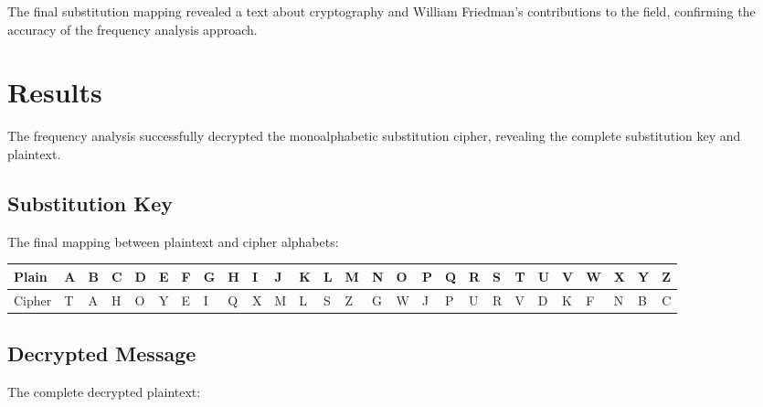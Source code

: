 \documentclass[a4paper,12pt]{article}
\begin{document}
The final substitution mapping revealed a text about cryptography and William Friedman's contributions to the field, confirming the accuracy of the frequency analysis approach.
\section{Results}
\label{sec:org187c133}
The frequency analysis successfully decrypted the monoalphabetic substitution cipher, revealing the complete substitution key and plaintext.
\subsection{Substitution Key}
\label{sec:orgd3b963a}
The final mapping between plaintext and cipher alphabets:

\begin{table}[htbp]
\label{tab:org799a319}
\centering
\scriptsize
\begin{tabular}{lllllllllllllllllllllllllll}
Plain & A & B & C & D & E & F & G & H & I & J & K & L & M & N & O & P & Q & R & S & T & U & V & W & X & Y & Z\\
\hline
Cipher & T & A & H & O & Y & E & I & Q & X & M & L & S & Z & G & W & J & P & U & R & V & D & K & F & N & B & C\\
\end{tabular}
\end{table}
\subsection{Decrypted Message}
\label{sec:org293212c}
The complete decrypted plaintext:
\end{document}
